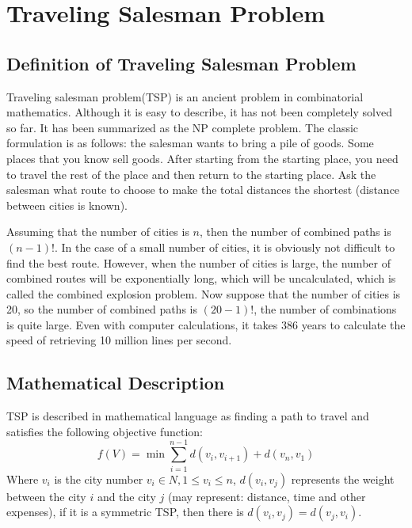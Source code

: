 \documentclass[12pt]{article}
\begin{document}
\section{Traveling Salesman Problem}
\subsection{Definition of Traveling Salesman Problem}


Traveling salesman problem(TSP) is an ancient problem in combinatorial mathematics. 
Although it is easy to describe, it has not been completely solved so far. 
It has been summarized as the NP complete problem. 
The classic formulation is as follows: 
the salesman wants to bring a pile of goods. 
Some places that you know sell goods. 
After starting from the starting place, 
you need to travel the rest of the place and then return to the starting place. 
Ask the salesman what route to choose to make the total distances the shortest (distance between cities is known).

Assuming that the number of cities is $n$, then the number of combined paths is $(n-1)!$.
In the case of a small number of cities, 
it is obviously not difficult to find the best route.
However, when the number of cities is large, 
the number of combined routes will be exponentially long, 
which will be uncalculated,
which is called the combined explosion problem.
Now suppose that the number of cities is 20, so the number of combined paths is $(20-1)!$, 
the number of combinations is quite large.
Even with computer calculations, it takes 386 years to calculate the speed of retrieving 10 million lines per second.

\subsection{Mathematical Description}
TSP is described in mathematical language as 
finding a path to travel and satisfies the following objective function:
\begin{equation}
    f(V)=\min \sum_{i=1}^{n-1} d\left(v_{i}, v_{i+1}\right)+d\left(v_{n}, v_{1}\right)
\end{equation}
Where $v_i$ is the city number $v_i\in N,1\leq v_i\leq n$, 
$d(v_i,v_j)$ represents the weight between the city $i$ and the city $j$ 
(may represent: distance, time and other expenses), 
if it is a symmetric TSP, then there is $d(v_i,v_j)=d(v_j,v_i)$.
\end{document}
